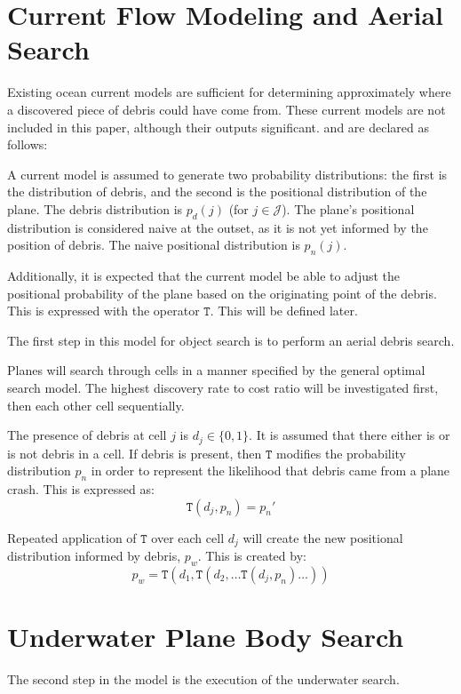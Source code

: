 \documentclass[a4paper]{article}
\begin{document}
\section{Current Flow Modeling and Aerial Search}

Existing ocean current models are sufficient for determining approximately where a discovered piece of debris could have come from. These current models are not included in this paper, although their outputs significant. and are declared as follows:

A current model is assumed to generate two probability distributions: the first is the distribution of debris, and the second is the positional distribution of the plane. The debris distribution is $p_d(j)$ (for $j\in\mathcal{J}$). The plane's positional distribution is considered naive at the outset, as it is not yet informed by the position of debris. The naive positional distribution is $p_n(j)$. 

Additionally, it is expected that the current model be able to adjust the positional probability of the plane based on the originating point of the debris. This is expressed with the operator $\mathtt{T}$. This will be defined later. 

The first step in this model for object search is to perform an aerial debris search. 

Planes will search through cells in a manner specified by the general optimal search model. The highest discovery rate to cost ratio will be investigated first, then each other cell sequentially.

The presence of debris at cell $j$ is $d_j\in \{0,1\}$. It is assumed that there either is or is not debris in a cell. If debris is present, then $\mathtt{T}$ modifies the probability distribution $p_n$ in order to represent the likelihood that debris came from a plane crash. This is expressed as: $$\mathtt{T}(d_j,p_n)=p_n'$$

Repeated application of $\mathtt{T}$ over each cell $d_j$ will create the new positional distribution informed by debris, $p_w$. This is created by: $$p_w=\mathtt{T}(d_1, \mathtt{T}(d_2, \ldots \mathtt{T}(d_j, p_n)\ldots))$$

\section{Underwater Plane Body Search}

The second step in the model is the execution of the underwater search. 
\end{document}
